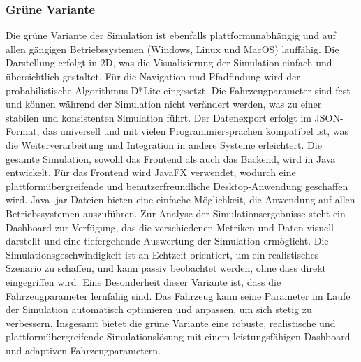\documentclass[main.tex]{subfiles} %
\begin{document}
\subsubsection*{Grüne Variante}
Die grüne Variante der Simulation ist ebenfalls plattformunabhängig und auf allen gängigen Betriebssystemen (Windows, Linux und MacOS) lauffähig. 
Die Darstellung erfolgt in 2D, was die Visualisierung der Simulation einfach und übersichtlich gestaltet. Für die Navigation und Pfadfindung 
wird der probabilistische Algorithmus D*Lite eingesetzt. Die Fahrzeugparameter sind fest und können während der Simulation nicht verändert 
werden, was zu einer stabilen und konsistenten Simulation führt. Der Datenexport erfolgt im JSON-Format, das universell und mit vielen 
Programmiersprachen kompatibel ist, was die Weiterverarbeitung und Integration in andere Systeme erleichtert. Die gesamte Simulation, 
sowohl das Frontend als auch das Backend, wird in Java entwickelt. Für das Frontend wird JavaFX verwendet, wodurch eine plattformübergreifende 
und benutzerfreundliche Desktop-Anwendung geschaffen wird. Java .jar-Dateien bieten eine einfache Möglichkeit, die Anwendung auf allen 
Betriebssystemen auszuführen. Zur Analyse der Simulationsergebnisse steht ein Dashboard zur Verfügung, das die verschiedenen Metriken 
und Daten visuell darstellt und eine tiefergehende Auswertung der Simulation ermöglicht. Die Simulationsgeschwindigkeit ist an Echtzeit 
orientiert, um ein realistisches Szenario zu schaffen, und kann passiv beobachtet werden, ohne dass direkt eingegriffen wird. Eine Besonderheit 
dieser Variante ist, dass die Fahrzeugparameter lernfähig sind. Das Fahrzeug kann seine Parameter im Laufe der Simulation automatisch optimieren 
und anpassen, um sich stetig zu verbessern. Insgesamt bietet die grüne Variante eine robuste, realistische und plattformübergreifende 
Simulationslösung mit einem leistungsfähigen Dashboard und adaptiven Fahrzeugparametern.
\end{document}
